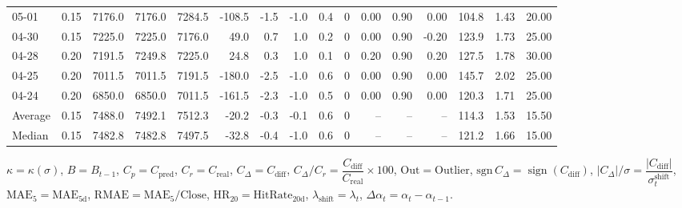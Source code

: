 \begin{threeparttable}
{\begin{tabular}{lrrrrrrrrrrrrrrr}
  05-01 &     0.15 & 7176.0 & 7176.0 & 7284.5 &     -108.5 &           -1.5 &                     -1.0 &                 0.4 &              0 &       0.00 &      0.90 &           0.00 &            104.8 &            1.43 &                  20.00 \\
  04-30 &     0.15 & 7225.0 & 7225.0 & 7176.0 &       49.0 &            0.7 &                      1.0 &                 0.2 &              0 &       0.00 &      0.90 &          -0.20 &            123.9 &            1.73 &                  25.00 \\
  04-28 &     0.20 & 7191.5 & 7249.8 & 7225.0 &       24.8 &            0.3 &                      1.0 &                 0.1 &              0 &       0.20 &      0.90 &           0.20 &            127.5 &            1.78 &                  30.00 \\
  04-25 &     0.20 & 7011.5 & 7011.5 & 7191.5 &     -180.0 &           -2.5 &                     -1.0 &                 0.6 &              0 &       0.00 &      0.90 &           0.00 &            145.7 &            2.02 &                  25.00 \\
  04-24 &     0.20 & 6850.0 & 6850.0 & 7011.5 &     -161.5 &           -2.3 &                     -1.0 &                 0.5 &              0 &       0.00 &      0.90 &           0.00 &            120.3 &            1.71 &                  25.00 \\
Average &     0.15 & 7488.0 & 7492.1 & 7512.3 &      -20.2 &           -0.3 &                     -0.1 &                 0.6 &              0 &         -- &        -- &             -- &            114.3 &            1.53 &                  15.50 \\
 Median &     0.15 & 7482.8 & 7482.8 & 7497.5 &      -32.8 &           -0.4 &                     -1.0 &                 0.6 &              0 &         -- &        -- &             -- &            121.2 &            1.66 &                  15.00 \\
\bottomrule
\end{tabular}
}
\begin{tablenotes}\footnotesize
\item $\kappa=\kappa(\sigma)$, $B=B_{t-1}$, $C_p=C_{\text{pred}}$, $C_r=C_{\text{real}}$, $C_\Delta=C_{\text{diff}}$, $C_\Delta/C_r=\dfrac{C_{\text{diff}}}{C_{\text{real}}}\times100$, $\mathrm{Out}=\text{Outlier}$, $\mathrm{sgn}\,C_\Delta=\operatorname{sign}(C_{\text{diff}})$, $|C_\Delta|/\sigma=\dfrac{|C_{\text{diff}}|}{\sigma_t^{\text{shift}}}$, $\mathrm{MAE}_5=\mathrm{MAE}_{5\text{d}}$, $\mathrm{RMAE}= \mathrm{MAE}_5 / \text{Close}$, $\mathrm{HR}_{20}=\mathrm{HitRate}_{20\text{d}}$, 
$\lambda_{\text{shift}}=\lambda_t$, 
$\Delta\alpha_t=\alpha_t-\alpha_{t-1}$.
\end{tablenotes}
\end{threeparttable}
\endgroup

